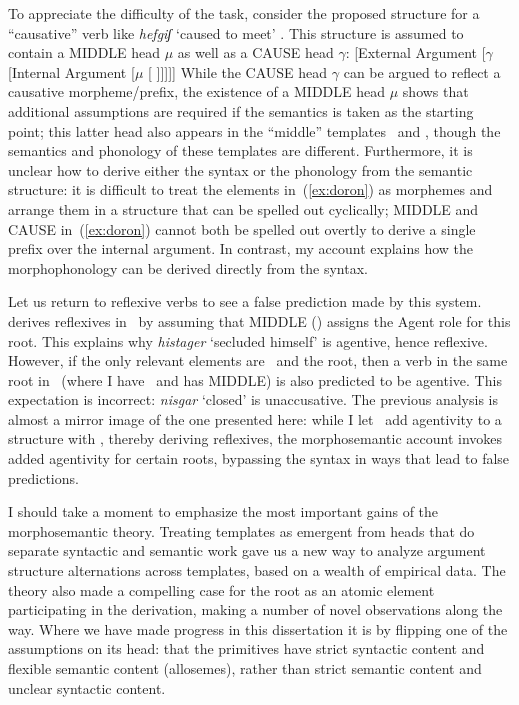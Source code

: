 To appreciate the difficulty of the task, consider the proposed structure for a  ``causative'' verb like \emph{hefgiʃ} `caused to meet' \citep[61]{doron03}. This structure is assumed to contain a MIDDLE head $\mu$ as well as a CAUSE head $\gamma$:
\ex \label{ex:doron}[External Argument [$\gamma$ [Internal Argument [$\mu$ [ ]]]]] 
\xe
While the CAUSE head $\gamma$ can be argued to reflect a causative morpheme/prefix, the existence of a MIDDLE head $\mu$ shows that additional assumptions are required if the semantics is taken as the starting point; this latter head also appears in the ``middle'' templates \tnif~and \thit, though the semantics and phonology of these templates are different. Furthermore, it is unclear how to derive either the syntax or the phonology from the semantic structure: it is difficult to treat the elements in~(\ref{ex:doron}) as morphemes and arrange them in a structure that can be spelled out cyclically; MIDDLE and CAUSE in~(\ref{ex:doron}) cannot both be spelled out overtly to derive a single prefix over the internal argument. In contrast, my account explains how the morphophonology can be derived directly from the syntax.

Let us return to reflexive verbs to see a false prediction made by this system. \citet[60]{doron03} derives reflexives in \thit~by assuming that MIDDLE (\vz) assigns the Agent role for this root. This explains why \emph{histager} `secluded himself' is agentive, hence reflexive. However, if the only relevant elements are \vz~and the root, then a verb in the same root in \tnif~(where I have \vz~and \citealt{doron03} has MIDDLE) is also predicted to be agentive. This expectation is incorrect: \emph{nisgar} `closed' is unaccusative. The previous analysis is almost a mirror image of the one presented here: while I let \va~add agentivity to a structure with \vz, thereby deriving reflexives, the morphosemantic account invokes added agentivity for certain roots, bypassing the syntax in ways that lead to false predictions.

I should take a moment to emphasize the most important gains of the morphosemantic theory. Treating templates as emergent from heads that do separate syntactic and semantic work gave us a new way to analyze argument structure alternations across templates, based on a wealth of empirical data. The theory also made a compelling case for the root as an atomic element participating in the derivation, making a number of novel observations along the way. Where we have made progress in this dissertation it is by flipping one of the assumptions on its head: that the primitives have strict syntactic content and flexible semantic content (allosemes), rather than strict semantic content and unclear syntactic content.

